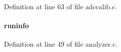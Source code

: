 Definition at line 63 of file adccalib.c.
\paragraph[{runinfo}]{ {\bf runinfo}}\hfill\label{adccalib_8c_ade46d29add32a0b6910ebc8da0fea69b}


Definition at line 49 of file analyzer.c.